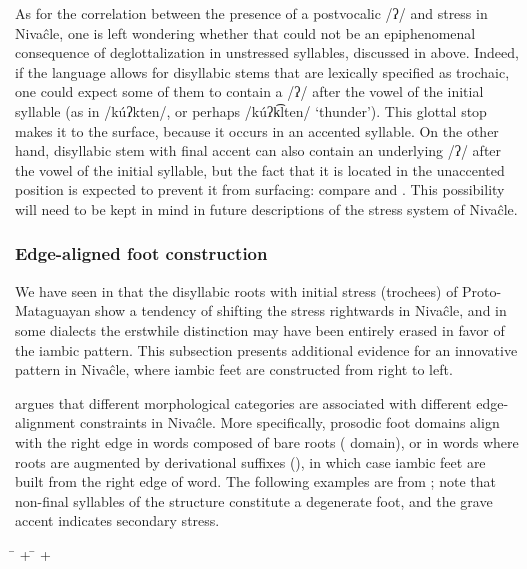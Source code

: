 As for the correlation between the presence of a postvocalic /ʔ/ and stress in Nivaĉle, one is left wondering whether that could not be an epiphenomenal consequence of deglottalization in unstressed syllables, discussed in  above. Indeed, if the language allows for disyllabic stems that are lexically specified as trochaic, one could expect some of them to contain a /ʔ/ after the vowel of the initial syllable (as in /kúʔkten/, or perhaps /kúʔk͡lten/ `thunder'). This glottal stop makes it to the surface, because it occurs in an accented syllable. On the other hand, disyllabic stem with final accent can also contain an underlying /ʔ/ after the vowel of the initial syllable, but the fact that it is located in the unaccented position is expected to prevent it from surfacing: compare  and  \citep[138]{JS16}. This possibility will need to be kept in mind in future descriptions of the stress system of Nivaĉle.

\subsubsection{Edge-aligned foot construction}

We have seen in  that the disyllabic roots with initial stress (trochees) of Proto-Mataguayan show a tendency of shifting the stress rightwards in Nivaĉle, and in some dialects the erstwhile distinction may have been entirely erased in favor of the iambic pattern. This subsection presents additional evidence for an innovative pattern in Nivaĉle, where iambic feet are constructed from right to left.

\citet{AnG15} argues that different morphological categories are associated with different edge-alignment constraints in Nivaĉle. More specifically, prosodic foot domains align with the right edge in words composed of bare roots ( domain), or in words where roots are augmented by derivational suffixes (), in which case iambic feet are built from the right edge of word. The following examples are from \citet[165, 173]{AnG15}; note that non-final syllables of the structure  constitute a degenerate foot, and the grave accent indicates secondary stress.

\newpage
{}
\ea
    \begin{xlist}
        \ex {}
        \ex {}
        \ex {}
        \ex {}
        \ex {}
        \ex {} \= +
        \ex {}
        \ex {} \= +
    \end{xlist}
\z
{}

